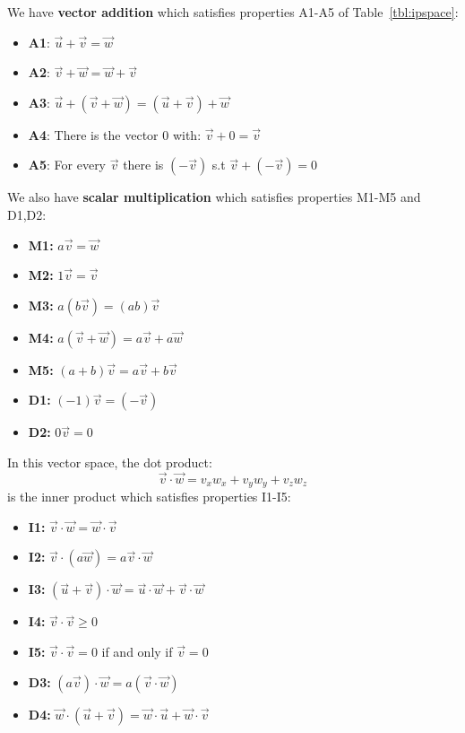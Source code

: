 \documentclass[12pt]{book}
\begin{document}
\begin{samepage}
We have {\bf vector addition} which satisfies properties A1-A5 of Table~\ref{tbl:ipspace}:
\begin{itemize}
\item {\bf A1}: $\vec{u} + \vec{v} = \vec{w}$ 
\item {\bf A2}: $\vec{v} + \vec{w} = \vec{w} + \vec{v}$
\item {\bf A3}: $\vec{u} + (\vec{v} + \vec{w}) = (\vec{u} + \vec{v}) + \vec{w} $
\item {\bf A4}: There is the vector 0 with: $\vec{v} + 0 = \vec{v} $
\item {\bf A5}: For every $\vec{v}$ there is $(-\vec{v})$ s.t $\vec{v} + (-\vec{v}) = 0$
\end{itemize}
\end{samepage}

\begin{samepage}
\noindent
We also have {\bf scalar multiplication} which satisfies properties M1-M5 and D1,D2:
\begin{itemize}
\item {\bf M1:} $a \vec{v} = \vec{w}$
\item {\bf M2:} $1 \vec{v} = \vec{v}$
\item {\bf M3:} $a(b\vec{v}) = (ab)\vec{v}$
\item {\bf M4:} $a(\vec{v} + \vec{w}) = a\vec{v} + a\vec{w}$
\item {\bf M5:} $(a+b)\vec{v} = a\vec{v} + b\vec{v}$
\item {\bf D1:} $(-1)\vec{v} = (-\vec{v})$
\item {\bf D2:} $0\vec{v} = 0$
\end{itemize}
\end{samepage}

\noindent
In this vector space, the dot product:
\begin{displaymath}
\vec{v} \cdot \vec{w} = v_x w_x + v_y w_y + v_z w_z 
\end{displaymath}
is the inner product which satisfies properties I1-I5:
\begin{itemize}
\item {\bf I1:} $\vec{v} \cdot \vec{w} = \vec{w} \cdot \vec{v}$
\item {\bf I2:} $\vec{v} \cdot \left(a\vec{w}\right) = a \vec{v} \cdot \vec{w}$
\item {\bf I3:} $\left(\vec{u} + \vec{v}\right) \cdot \vec{w} = \vec{u} \cdot \vec{w} + \vec{v} \cdot \vec{w} $
\item {\bf I4:} $\vec{v} \cdot \vec{v} \geq 0$
\item {\bf I5:} $\vec{v} \cdot \vec{v} = 0$ if and only if $\vec{v} = 0$
\item {\bf D3:} $\left(a\vec{v}\right) \cdot \vec{w} = a \left( \vec{v} \cdot \vec{w}\right) $
\item {\bf D4:} $\vec{w} \cdot \left(\vec{u} + \vec{v}\right)  = \vec{w} \cdot \vec{u} + \vec{w} \cdot \vec{v}$
\end{itemize}
\end{document}

